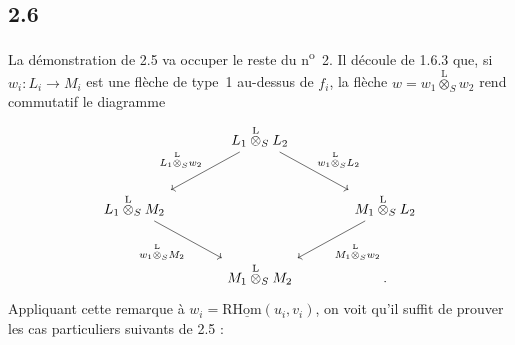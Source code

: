 \subsection*{2.6}
La démonstration de 2.5 va occuper le reste du n\textsuperscript{o}~2. Il découle de 1.6.3 que, si $w_i:L_i\to M_i$ est une flèche de type~1 au-dessus de $f_i$, la flèche $w=w_1\overset{\mathrm{L}}{\otimes}_{S}w_2$ rend commutatif le diagramme
\[
\begin{tikzcd}[column sep=large,row sep=large]
& L_1\overset{\mathrm{L}}{\otimes}_S L_2 \arrow[dl,"{L_1\overset{\mathrm{L}}{\otimes}_S w_2}"'] \arrow[dr,"{w_1\overset{\mathrm{L}}{\otimes}_S L_2}"] & \\
L_1\overset{\mathrm{L}}{\otimes}_S M_2 \arrow[dr,"{w_1\overset{\mathrm{L}}{\otimes}_S M_2}"'] & & M_1\overset{\mathrm{L}}{\otimes}_S L_2 \arrow[dl,"{M_1\overset{\mathrm{L}}{\otimes}_S w_2}"]\\
& M_1\overset{\mathrm{L}}{\otimes}_S M_2 & .
\end{tikzcd}
\]
Appliquant cette remarque à $w_i=\mathrm{R}\underline{\mathrm{Hom}}(u_i,v_i)$, on voit qu'il suffit de prouver les cas particuliers suivants de 2.5 :

